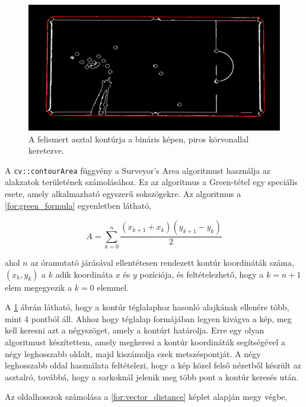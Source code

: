 \begin{figure}[!ht]
    \centering
    \includegraphics[width=140mm, keepaspectratio]{figures/input_screen_contour.png}
    \caption{A felismert asztal kontúrja a bináris képen, piros körvonallal keretezve.}
    \label{fig:bemeneti_kep_contour}
\end{figure}

\par A \lstinline{cv::contourArea} függvény a Surveyor's Area algoritmust \cite{braden1986surveyor} használja az alakzatok területének számolásához. Ez az algoritmus a Green-tétel egy speciális esete, amely alkalmazható egyszerű sokszögekre.
\newline Az algoritmus a \ref{for:green_formula} egyenletben látható,

\begin{equation}
    A = \sum^n_{k=0}\frac{(x_{k+1} + x_k)(y_{k+1} - y_k)}{2}
    \label{for:green_formula}
\end{equation}

\par ahol $n$ az óramutató járásával ellentétesen rendezett kontúr koordináták száma, $(x_k, y_k)$ a $k$ adik koordináta $x$ és $y$ pozíciója, és feltételezhető, hogy a $k = n+1$ elem megegyezik a $k = 0$ elemmel.

\par A \ref{fig:bemeneti_kep_contour} ábrán látható, hogy a kontúr téglalaphoz hasonló alajkának ellenére több, mint 4 pontból áll. Ahhoz hogy téglalap formájában legyen kivágva a kép, meg kell keresni azt a négyszöget, amely a kontúrt határolja. Erre egy olyan algoritmust készítettem, amely megkeresi a kontúr koordináták segítségével a négy leghosszabb oldalt, majd kiszámolja ezek metszéspontját. A négy leghosszabb oldal használata feltételezi, hogy a kép közel felső nézetből készült az asztalró, továbbá, hogy a sarkoknál jelenik meg több pont a kontúr keresés után.
\par Az oldalhosszok számolása a \ref{for:vector_distance} képlet alapján megy végbe,

